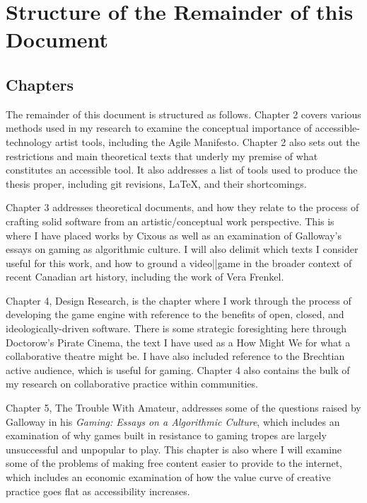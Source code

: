 
\section{Structure of the Remainder of this Document}

\subsection{Chapters}
The remainder of this document is structured as follows. Chapter 2 covers various methods used in my research to examine the conceptual importance of accessible-technology artist tools, including the Agile Manifesto. Chapter 2 also sets out the restrictions and main theoretical texts that underly my premise of what constitutes an accessible tool. It also addresses a list of tools used to produce the thesis proper, including git revisions, LaTeX, and their shortcomings. 

Chapter 3 addresses theoretical documents, and how they relate to the process of crafting solid software from an artistic/conceptual work perspective. This is where I have placed works by Cixous as well as an examination of Galloway's essays on gaming as algorithmic culture. I will also delimit which texts I consider useful for this work, and how to ground a video||game in the broader context of recent Canadian art history, including the work of Vera Frenkel. 

Chapter 4, Design Research, is the chapter where I work through the process of developing the game engine with reference to the benefits of open, closed, and ideologically-driven software. There is some strategic foresighting here through Doctorow's Pirate Cinema, the text I have used as a How Might We for what a collaborative theatre might be. I have also included reference to the Brechtian active audience, which is useful for gaming. Chapter 4 also contains the bulk of my research on collaborative practice within communities.

Chapter 5, The Trouble With Amateur, addresses some of the questions raised by Galloway in his \textit{Gaming: Essays on a Algorithmic Culture}, which includes an examination of why games built in resistance to gaming tropes are largely unsuccessful and unpopular to play. This chapter is also where I will examine some of the problems of making free content easier to provide to the internet, which includes an economic examination of how the value curve of creative practice goes flat as accessibility increases.

